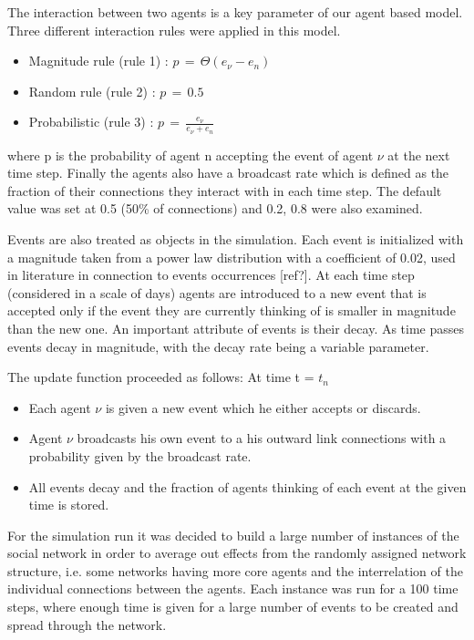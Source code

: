 \documentclass [12pt,a4paper,twoside]{article}
\begin{document}
The interaction between two agents is a key parameter of our agent based model. Three different interaction rules were applied in this model.
\begin{itemize}
\item Magnitude rule (rule 1) : $p\, = \,\Theta(e_{\nu}-e_n)$
\item Random rule (rule 2) : $p\,=\,0.5$
\item Probabilistic (rule 3) : $p\,=\, \frac{e_{\nu}}{e_{\nu}+e_n}$
\end{itemize}
where p is the probability of agent n accepting the event of agent $\nu$ at the next time step. Finally the agents also have a broadcast rate which is defined as the fraction of their connections they interact with in each time step. The default value was set at 0.5 (50\% of connections) and 0.2, 0.8 were also examined.

Events are also treated as objects in the simulation. Each event is initialized with a magnitude taken from a power law distribution with a coefficient of 0.02, used in literature in connection to events occurrences [ref?]. At each time step (considered in a scale of days) agents are introduced to a new event that is accepted only if the event they are currently thinking of is smaller in magnitude than the new one. An important attribute of events is their decay. As time passes events decay in magnitude, with the decay rate being a variable parameter.

The update function proceeded as follows:
At time t = $t_n$
\begin{itemize}
\item Each agent $\nu$ is given a new event which he either accepts or discards.
\item Agent $\nu$ broadcasts his own event to a his outward link connections with a probability given by the broadcast rate.
\item All events decay and the fraction of agents thinking of each event at the given time is stored.
\end{itemize}

For the simulation run it was decided to build a large number of instances of the social network in order to average out effects from the randomly assigned network structure, i.e. some networks having more core agents and the interrelation of the individual connections between the agents. Each instance was run for a 100 time steps, where enough time is given for a large number of events to be created and spread through the network. 
\end{document}
